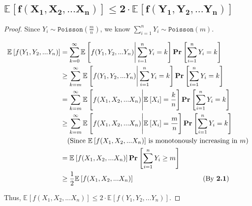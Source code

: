 \documentclass{article}
\renewcommand{\Pr}[2]{\mathbf{Pr}_{#1}\left[#2\right]}
\newcommand{\staExp}[2]{\mathbb{E}_{#1}\left[#2\right]}
\begin{document}
\subsection{$\boldsymbol{\staExp{}{f(X_1,X_2,...X_n)}\le2\cdot\staExp{}{f(Y_1,Y_2,...Y_n)}}$}
\vspace{1em}
\begin{proof}
    Since $Y_i\sim\mathtt{Poisson}(\frac{m}{n})$, we know $\sum_{i=1}^nY_i\sim\mathtt{Poisson}(m)$.
        
    \vspace{-2em}
    \begin{align*}
        \staExp{}{f(Y_1,Y_2,...Y_n)}&=\sum_{k=0}^{\infty}\staExp{}{f(Y_1,Y_2,...Y_n)\Bigg|\sum_{i=1}^n Y_i=k}\Pr{}{\sum_{i=1}^n Y_i=k} \\
        &\geq \sum_{k=m}^{\infty} \staExp{}{f(Y_1,Y_2,...Y_n)\Bigg|\sum_{i=1}^nY_i=k}\Pr{}{\sum_{i=1}^nY_i=k} \\
        &=\sum_{k=m}^{\infty}\staExp{}{f(X_1,X_2,...X_n)\Bigg|\staExp{}{X_i}=\frac{k}{n}}\Pr{}{\sum_{i=1}^nY_i=k} \\
        &\geq\sum_{k=m}^{\infty}\staExp{}{f(X_1,X_2,...X_n)\Bigg|\staExp{}{X_i}=\frac{m}{n}}\Pr{}{\sum_{i=1}^nY_i=k} \\
        &\quad\text{(Since $\staExp{}{f(X_1,X_2,...X_n)}$ is monotonously increasing in $m$)} \\
        &= \staExp{}{f(X_1,X_2,...X_n)}\Pr{}{\sum_{i=1}^nY_i\geq m}\\
        &\geq \frac{1}{2}\staExp{}{f(X_1,X_2,...X_n)} \qquad\qquad\qquad\qquad\qquad\text{(By \textbf{2.1})}
    \end{align*}
    
    \vspace{-0.25em} \hspace{1.3em}
    Thus, $\staExp{}{f(X_1,X_2,...X_n)}\le 2\cdot\staExp{}{f(Y_1,Y_2,...Y_n)}$.
\end{proof}

\vspace{3em}
\end{document}
